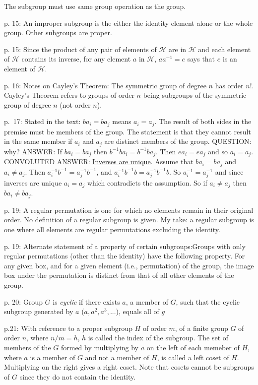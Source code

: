 \documentclass{book}
\begin{document}
The subgroup must use same group operation as the group.

p. 15: An improper subgroup is the either the identity element alone or the whole group. Other subgroups are proper.

p. 15: Since the product of any pair of elements of $\mathcal H$ are
in $\mathcal H$ and each element of $\mathcal H$ contains its inverse,
for any element $a$ in $\mathcal H$, $aa^{-1} = e$ says that $e$ is an
element of $\mathcal H$.

p. 16: Notes on Cayley's Theorem: The symmetric group of degree $n$
has order $n!$. Cayley's Theorem refers to groups of order $n$ being
subgroups of the symmetric group of degree $n$ (not order $n$).

p.\ 17: Stated in the text: $ba_i = ba_j$ means $a_i = a_j$. The
result of both sides in the premise must be members of the group. The
statement is that they cannot result in the same member if $a_i$ and
$a_j$ are distinct members of the group. QUESTION: why? ANSWER: If
$ba_i = ba_j$ then $b^{-1}ba_i = b^{-1}ba_j$. Then $ea_i = ea_j$ and
so $a_i = a_j$. CONVOLUTED ANSWER:
\href{https://planetmath.org/uniquenessofinverseforgroups}{Inverses
  are unique}. Assume that $ba_i = ba_j$ and $a_i \neq a_j$. Then
$a^{-1}_i b^{-1} = a^{-1}_j b^{-1}$, and $a^{-1}_i b^{-1} b = a^{-1}_j
b^{-1} b$. So $a^{-1}_i = a^{-1}_j$ and since inverses are unique $a_i
= a_j$ which contradicts the assumption. So if $a_i \neq a_j$ then
$ba_i \neq ba_j$.

p. 19: A regular permutation is one for which no elements remain in
their original order. No definition of a regular subgroup is given. My
take: a regular subgroup is one where all elements are regular
permutations excluding the identity.

p. 19: Alternate statement of a property of certain
subgroups:\hfil\break Groups with only regular permutations (other
than the identity) have the following property. For any given box,
and for a given element (i.e., permutation) of the group, the image
box under the permutation is distinct from that of all other elements
of the group.

p. 20: Group $G$ is {\it cyclic} if there exists $a$, a member of $G$,
such that the cyclic subgroup generated by $a$ ($a,a^2,a^3,...$),
equals all of $g$

p.21: With reference to a proper subgroup $H$ of order $m$, of a
finite group $G$ of order $n$, where $n/m = h$, $h$ is called the
index of the subgroup. The set of members of the $G$ formed by
multiplying by $a$ on the left of each memeber of $H$, where $a$ is a
member of $G$ and not a member of $H$, is called a left coset of
$H$. Multiplying on the right gives a right coset. Note that cosets
cannot be subgroups of $G$ since they do not contain the identity.
\end{document}
